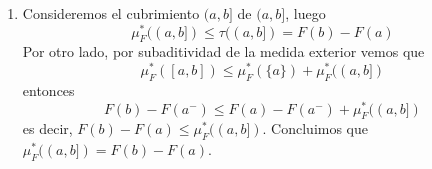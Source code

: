 \documentclass{article}
\begin{document}
\begin{enumerate}
    \item Consideremos el cubrimiento $(a,b]$ de $(a,b]$, luego
    \begin{equation*}
        \mu_{F}^{*}((a,b])\leq\tau((a,b])=F(b)-F(a)
    \end{equation*}
    Por otro lado, por subaditividad de la medida exterior vemos que
    \begin{equation*}
        \mu_{F}^{*}([a,b])\leq\mu_{F}^{*}(\{a\})+\mu_{F}^{*}((a,b])
    \end{equation*}
    entonces
    \begin{equation*}
        F(b)-F(a^{-})\leq F(a)-F(a^{-})+\mu_{F}^{*}((a,b])
    \end{equation*}
    es decir, $F(b)-F(a)\leq\mu_{F}^{*}((a,b])$. Concluimos que $\mu_{F}^{*}((a,b])=F(b)-F(a)$.
\end{enumerate}

\end{document}
